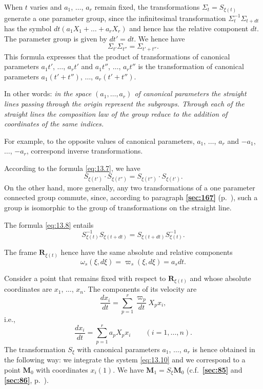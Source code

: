\documentclass[leqno,11pt]{book}
\numberwithin{equation}{chapter}
\theoremstyle{shape1}
\theoremstyle{shapesmall}
\newcommand{\fsref}[1]{{\rm\textsection\textbf{\ref{sec:#1}}}}
\newcommand{\vp}{\varpi}
\begin{document}
When $t$ varies and $a_{1}$, $\dots$, $a_{r}$ remain fixed, the transformations $\Sigma_{t}=S_{\xi(t)}$ generate a one parameter group, since the infinitesimal transformation $\Sigma_{t}^{-1}\Sigma_{t+dt}$ has the symbol $dt(a_{1}X_{1}+\dots+a_{r}X_{r})$ and hence has the relative component $dt$. The parameter group is given by $dt'=dt$. We hence have
\begin{equation}
  \label{eq:13.7}
  \Sigma_{t'}\Sigma_{t''}=\Sigma_{t'+t''}.
\end{equation}
This formula expresses that the product of transformations of canonical parameters $a_{1}t'$, $\dots$, $a_{r}t'$ and $a_{1}t''$, $\dots$, $a_{r}t''$ is the transformation of canonical parameters $a_{1}(t'+t'')$, $\dots$, $a_{r}(t'+t'')$.

In other words: \emph{in the space $(a_{1}, \dots, a_{r})$ of canonical parameters the straight lines passing through the origin represent the subgroups. Through each of the straight lines the composition law of the group reduce to the addition of coordinates of the same indices.}

For example, to the opposite values of canonical parameters, $a_{1}$, $\dots$, $a_{r}$ and $-a_{1}$, $\dots$, $-a_{r}$, correspond inverse transformations.

According to the formula \eqref{eq:13.7}, we have
\begin{equation}
  \label{eq:13.8}
  S_{\xi(t')}\cdot S_{\xi(t'')}=S_{\xi(t'')}\cdot S_{\xi(t')}.
\end{equation}
On the other hand, more generally, any two transformations of a one parameter connected group commute, since, according to paragraph \fsref{167} (p.~\pageref{sec:167}), such a group is isomorphic to the group of transformations on the straight line.

The formula \eqref{eq:13.8} entails
\[
S^{-1}_{\xi(t)}S_{\xi(t+dt)}=S_{\xi(t+dt)}S_{\xi(t)}^{-1}.
\]

The frame $\mathbf{R}_{\xi(t)}$ hence have the same absolute and relative components
\begin{equation}
  \label{eq:13.9}
  \omega_{s}(\xi,d\xi)=\vp_{s}(\xi,d\xi)=a_{s}dt.
\end{equation}

Consider a point that remains fixed with respect to $\mathbf{R}_{\xi(t)}$ and whose absolute coordinates are $x_{1}$, $\dots$, $x_{n}$. The components of its velocity are
\[
\frac{dx_{i}}{dt}=\sum_{p=1}^{r}\frac{\vp_{p}}{dt}X_{p}x_{i},
\]
i.e.,
\begin{equation}
  \label{eq:13.10}
  \frac{dx_{i}}{dt}=\sum_{p=1}^{r}a_{p}X_{p}x_{i}\qquad(i=1,\dots,n).
\end{equation}
The transformation $S_{\xi}$ with canonical parameters $a_{1}$, $\dots$, $a_{r}$ is hence obtained in the following way: we integrate the system \eqref{eq:13.10} and we correspond to a point $\mathbf{M}_{0}$ with coordinates $x_{i}(1)$. We have $\mathbf{M}_{1}=S_{\xi}\mathbf{M}_{0}$ (c.f.~\fsref{85} and \fsref{86}, p.~\pageref{sec:85}).
\end{document}
